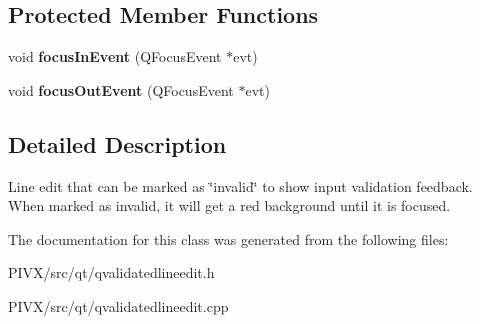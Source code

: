 \subsection*{Protected Member Functions}
\begin{DoxyCompactItemize}
\item 
\mbox{\label{class_q_validated_line_edit_a914d4efae9ac7c74faa3a4a82d26fec3}} 
void {\bfseries focus\+In\+Event} (Q\+Focus\+Event $\ast$evt)
\item 
\mbox{\label{class_q_validated_line_edit_a842e76d50efaa98a9eb1fa0343132503}} 
void {\bfseries focus\+Out\+Event} (Q\+Focus\+Event $\ast$evt)
\end{DoxyCompactItemize}


\subsection{Detailed Description}
Line edit that can be marked as \char`\"{}invalid\char`\"{} to show input validation feedback. When marked as invalid, it will get a red background until it is focused. 

The documentation for this class was generated from the following files\+:\begin{DoxyCompactItemize}
\item 
P\+I\+V\+X/src/qt/qvalidatedlineedit.\+h\item 
P\+I\+V\+X/src/qt/qvalidatedlineedit.\+cpp\end{DoxyCompactItemize}
